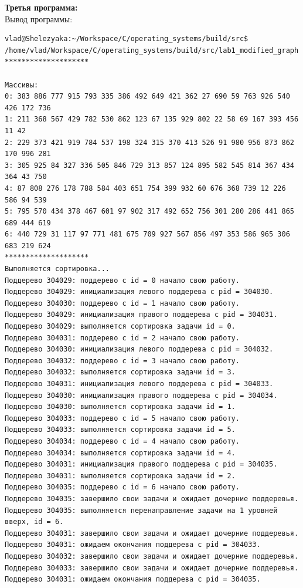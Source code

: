 \documentclass[a4paper,14pt]{extarticle}
\begin{document}
\textbf{Третья программа:}\\
Вывод программы:\\
\begin{verbatim}
vlad@Shelezyaka:~/Workspace/C/operating_systems/build/src$ /home/vlad/Workspace/C/operating_systems/build/src/lab1_modified_graph
********************

Массивы:
0: 383 886 777 915 793 335 386 492 649 421 362 27 690 59 763 926 540 426 172 736 
1: 211 368 567 429 782 530 862 123 67 135 929 802 22 58 69 167 393 456 11 42 
2: 229 373 421 919 784 537 198 324 315 370 413 526 91 980 956 873 862 170 996 281 
3: 305 925 84 327 336 505 846 729 313 857 124 895 582 545 814 367 434 364 43 750 
4: 87 808 276 178 788 584 403 651 754 399 932 60 676 368 739 12 226 586 94 539 
5: 795 570 434 378 467 601 97 902 317 492 652 756 301 280 286 441 865 689 444 619 
6: 440 729 31 117 97 771 481 675 709 927 567 856 497 353 586 965 306 683 219 624 
********************
Выполняется сортировка...
Поддерево 304029: поддерево с id = 0 начало свою работу.
Поддерево 304029: инициализация левого поддерева с pid = 304030.
Поддерево 304030: поддерево с id = 1 начало свою работу.
Поддерево 304029: инициализация правого поддерева с pid = 304031.
Поддерево 304029: выполняется сортировка задачи id = 0.
Поддерево 304031: поддерево с id = 2 начало свою работу.
Поддерево 304030: инициализация левого поддерева с pid = 304032.
Поддерево 304032: поддерево с id = 3 начало свою работу.
Поддерево 304032: выполняется сортировка задачи id = 3.
Поддерево 304031: инициализация левого поддерева с pid = 304033.
Поддерево 304030: инициализация правого поддерева с pid = 304034.
Поддерево 304030: выполняется сортировка задачи id = 1.
Поддерево 304033: поддерево с id = 5 начало свою работу.
Поддерево 304033: выполняется сортировка задачи id = 5.
Поддерево 304034: поддерево с id = 4 начало свою работу.
Поддерево 304034: выполняется сортировка задачи id = 4.
Поддерево 304031: инициализация правого поддерева с pid = 304035.
Поддерево 304031: выполняется сортировка задачи id = 2.
Поддерево 304035: поддерево с id = 6 начало свою работу.
Поддерево 304035: завершило свои задачи и ожидает дочерние поддеревья.
Поддерево 304035: выполняется перенаправление задачи на 1 уровней вверх, id = 6.
Поддерево 304031: завершило свои задачи и ожидает дочерние поддеревья.
Поддерево 304031: ожидаем окончания поддерева с pid = 304033.
Поддерево 304032: завершило свои задачи и ожидает дочерние поддеревья.
Поддерево 304033: завершило свои задачи и ожидает дочерние поддеревья.
Поддерево 304031: ожидаем окончания поддерева с pid = 304035.

\end{verbatim}
\end{document}
